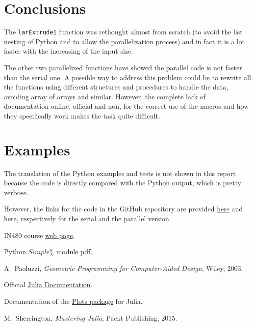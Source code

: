 \documentclass[a4paper,12pt,titlepage]{article}					%
\begin{document}
\section{Conclusions}
The \texttt{larExtrude1} function was rethought almost from scratch (to avoid the list nesting of Python and to allow the parallelization process) and in fact it is a lot faster with the increasing of the input size.

The other two parallelized functions have showed the parallel code is not faster than the serial one.
A possible way to address this problem could be to rewrite all the functions using different structures and procedures to handle the data, avoiding array of arrays and similar.
However, the complete lack of documentation online, official and non, for the correct use of the macros and how they specifically work makes the task quite difficult.


\clearpage
\thispagestyle{plain}
\appendix
\section{Examples}
The translation of the Python examples and tests is not shown in this report because the code is directly compared with the Python output, which is pretty verbose.

However, the links for the code in the GitHub repository are provided \href{https://github.com/EmaLoprevite/Simplexn/blob/master/test/examples-serial.jl}{here}
and \href{https://github.com/EmaLoprevite/Simplexn/blob/master/test/examples-parallel.jl}{here}, respectively for the serial and the parallel version.


\clearpage
\thispagestyle{plain}
\listoffigures

\clearpage												%
\thispagestyle{plain}										%

\begin{thebibliography}{9}

IN480 course \href{https://www.dia.uniroma3.it/~paoluzzi/web/did/calcoloparallelo/2018/}{web page}.

Python $Simple_{X}^{n}$ module \href{https://github.com/cvdlab/lar-cc/blob/master/doc/pdf/simplexn.pdf}{pdf}.

A.~Paoluzzi, \emph{Geometric Programming for Computer-Aided Design}, Wiley, 2003.

Official \href{https://docs.julialang.org/en/stable/}{Julia Documentation}.

Documentation of the \href{https://docs.juliaplots.org/latest/}{Plots package} for Julia.

M.~Sherrington, \emph{Mastering Julia}, Packt Publishing, 2015.

\end{thebibliography}
\end{document}
